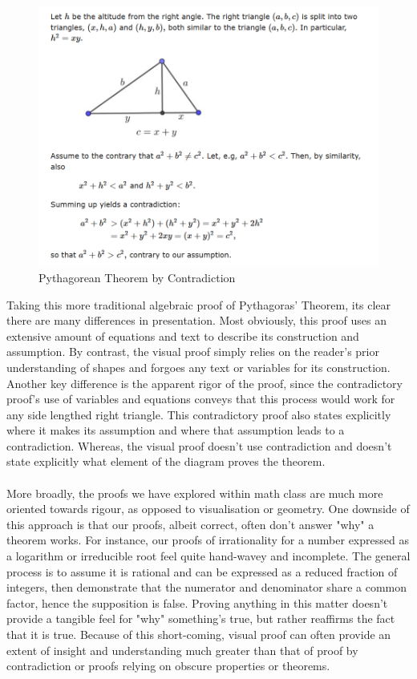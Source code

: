 \documentclass[11pt,a4paper]{article}
\begin{document}
\begin{figure}[h]
\begin{center}
\includegraphics[scale=.7]{contra} 
\caption{Pythagorean Theorem by Contradiction}
\end{center}
\end{figure}
Taking this more traditional algebraic proof of Pythagoras' Theorem, its clear there are many differences in presentation. Most obviously, this proof uses an extensive amount of equations and text to describe its construction and assumption. By contrast, the visual proof simply relies on the reader's prior understanding of shapes and forgoes any text or variables for its construction. Another key difference is the apparent rigor of the proof, since the contradictory proof's use of variables and equations conveys that this process would work for any side lengthed right triangle. This contradictory proof also states explicitly where it makes its assumption and where that assumption leads to a contradiction. Whereas, the visual proof doesn't use contradiction and doesn't state explicitly what element of the diagram proves the theorem.\\ \\
More broadly, the proofs we have explored within math class are much more oriented towards rigour, as opposed to visualisation or geometry. One downside of this approach is that our proofs, albeit correct, often don't answer "why" a theorem works. For instance, our proofs of irrationality for a number expressed as a logarithm or irreducible root feel quite hand-wavey and incomplete. The general process is to assume it is rational and can be expressed as a reduced fraction of integers, then demonstrate that the numerator and denominator share a common factor, hence the supposition is false. Proving anything in this matter doesn't provide a tangible feel for "why" something's true, but rather reaffirms the fact that it is true. Because of this short-coming, visual proof can often provide an extent of insight and understanding much greater than that of proof by contradiction or proofs relying on obscure properties or theorems.
\end{document}
